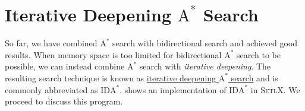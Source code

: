 \section{Iterative Deepening $\mathrm{A}^*$ Search}
So far, we have combined $\mathrm{A}^*$ search with bidirectional search and achieved good results.  When
memory space is too limited for bidirectional $\mathrm{A}^*$ search to be possible, we can instead
combine $\mathrm{A}^*$ search with \emph{iterative deepening}.  The resulting search technique is known as 
\href{https://en.wikipedia.org/wiki/Iterative_deepening_A*}{\color{blue}iterative deepening $\mathrm{A}^*$ search} 
and is commonly abbreviated as $\mathrm{IDA}^*$.   
shows an implementation of $\mathrm{IDA}^*$ in \textsc{SetlX}.  We proceed to discuss this program.

